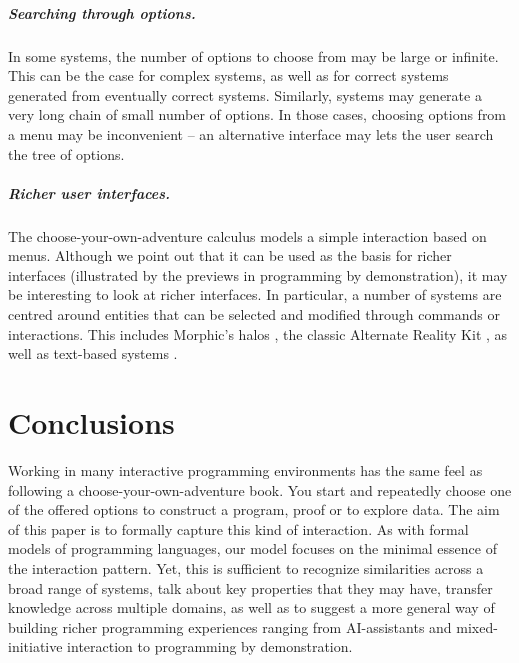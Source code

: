 \documentclass[ a4paper,UKenglish,cleveref, autoref, thm-restate]{lipics-v2021}
\begin{document}
\subparagraph{Searching through options.}
In some systems, the number of options to choose from may be large or infinite. This can be the
case for complex systems, as well as for correct systems generated from eventually correct systems.
Similarly, systems may generate a very long chain of small number of options. In those cases,
choosing options from a menu may be inconvenient -- an alternative interface may lets the
user search the tree of options.

\subparagraph{Richer user interfaces.}
The choose-your-own-adventure calculus models a simple interaction based on menus. Although
we point out that it can be used as the basis for richer interfaces (illustrated by the
previews in programming by demonstration), it may be interesting to look at richer interfaces.
In particular, a number of systems are centred around entities that can be selected and
modified through commands or interactions. This includes Morphic's halos
\cite{maloney-1995-morphic,maloney-2001-morphic}, the classic Alternate Reality Kit \cite{smith-1986-ark},
as well as text-based systems \cite{camarena-2025-embark}.

\section{Conclusions}
Working in many interactive programming environments has the same feel as following a
choose-your-own-adventure book. You start and repeatedly choose one of the offered options to
construct a program, proof or to explore data. The aim of this paper is to formally capture
this kind of interaction. As with formal models of programming languages, our model focuses on
the minimal essence of the interaction pattern. Yet, this is sufficient to recognize similarities
across a broad range of systems, talk about key properties that they may have, transfer knowledge
across multiple domains, as well as to suggest a more general way of building richer programming
experiences ranging from AI-assistants and mixed-initiative interaction to programming by demonstration.

\newpage


\end{document}
